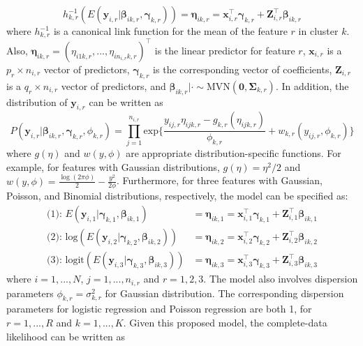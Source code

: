 \begin{equation}
h^{-1}_{k,r}(E(\boldsymbol{y}_{i,r}|\boldsymbol{\beta}_{ik,r},\boldsymbol{\gamma}_{k,r})) = \boldsymbol{\eta}_{ik,r} = \boldsymbol{x}_{i,r}^\top\boldsymbol{\gamma}_{k,r} +  \boldsymbol{Z}_{i,r}^\top\boldsymbol{\beta}_{ik,r}
\end{equation}
where $h_{k,r}^{-1}$ is a canonical link function for the mean of the feature $r$ in cluster $k$. Also, $\boldsymbol{\eta}_{ik,r} = (\eta_{i1k,r},...,\eta_{in_{i,r}k,r})^\top$ is the linear predictor for feature $r$, $\boldsymbol{x}_{i,r}$ is a $p_r\times n_{i,r}$ vector of predictors, $\boldsymbol{\gamma}_{k,r}$ is the corresponding vector of coefficients, $\boldsymbol{Z}_{i,r}$ is a $q_r\times n_{i,r}$ vector of predictors, and $\boldsymbol{\beta}_{ik,r}|\cdot \sim \text{MVN}(\boldsymbol{0},\boldsymbol{\Sigma}_{k,r})$. In addition, the distribution of $\boldsymbol{y}_{i,r}$ can be written as
\begin{equation}
P(\boldsymbol{y}_{i,r}|\boldsymbol{\beta}_{ik,r},\boldsymbol{\gamma}_{k,r}, \phi_{k,r}) = \prod_{j=1}^{n_{i,r}} \text{exp}\bigg\{ \frac{y_{ij,r}\eta_{ijk,r} - g_{k,r}(\eta_{ijk,r})}{\phi_{k,r}} + w_{k,r}(y_{ij,r},\phi_{k,r}) \bigg\} 
\end{equation}
where $g(\eta)$ and $w(y,\phi)$ are appropriate distribution-specific functions. For example, for features with Gaussian distributions, $g(\eta) = \eta^2/2$ and $w(y,\phi) = \frac{\log(2\pi\phi)}{2} - \frac{y^2}{2\phi}$. Furthermore, for three features with Gaussian, Poisson, and Binomial distributions, respectively, the model can be specified as: 
\begin{align*}
  \text{(1): }  E(\boldsymbol{y}_{i,1}|\boldsymbol{\gamma}_{k,1}, \boldsymbol{\beta}_{ik,1}) & = \boldsymbol{\eta}_{ik,1}  =   \boldsymbol{x}_{i,1}^\top\boldsymbol{\gamma}_{k,1} +  \boldsymbol{Z}_{i,1}^\top\boldsymbol{\beta}_{ik,1}  \\
  \text{(2): }    \text{log}(E(\boldsymbol{y}_{i,2}|\boldsymbol{\gamma}_{k,2}, \boldsymbol{\beta}_{ik,2})) & = \boldsymbol{\eta}_{ik,2}  =  \boldsymbol{x}_{i,2}^\top\boldsymbol{\gamma}_{k,2} +  \boldsymbol{Z}_{i,2}^\top\boldsymbol{\beta}_{ik,2} \\
  \text{(3): }   \text{logit}(E(\boldsymbol{y}_{i,3}|\boldsymbol{\gamma}_{k,3},\boldsymbol{\beta}_{ik,3})) & =  \boldsymbol{\eta}_{ik,3} = \boldsymbol{x}_{i,3}^\top\boldsymbol{\gamma}_{k,3} +  \boldsymbol{Z}_{i,3}^\top\boldsymbol{\beta}_{ik,3}
\end{align*}
where $i=1,...,N$, $j=1,...,n_{i,r}$ and $r=1,2,3$. The model also involves dispersion parameters $\phi_{k,r} = \sigma^2_{k,r}$ for Gaussian distribution. The corresponding dispersion parameters for logistic regression and Poisson regression are both 1, for $r=1,...,R$ and $k=1,...,K$. Given this proposed model, the complete-data likelihood can be written as
